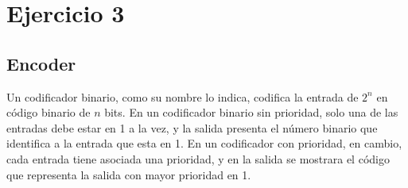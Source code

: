 \newpage

\section*{Ejercicio 3}
\subsection*{Encoder}
Un codificador binario, como su nombre lo indica, codifica la entrada de $2^{n}$ en c\'odigo binario 
de $n$ bits. En un codificador binario sin prioridad, solo una de las entradas debe estar en 1 a la 
vez, y la salida presenta el n\'umero binario que identifica a la entrada que esta en 1. En un codificador 
con prioridad, en cambio, cada entrada tiene asociada una prioridad, y en la salida se mostrara el c\'odigo 
que representa la salida con mayor prioridad en 1. \par
\noindent

